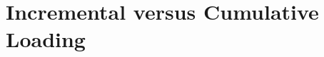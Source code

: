 \documentclass[bigger]{beamer}
\begin{document}
\section{Incremental versus Cumulative Loading}
\begin{frame}
  \begin{center}
    \incrementalcumulativeloads[1.1]
  \end{center}
\end{frame}
\end{document}
